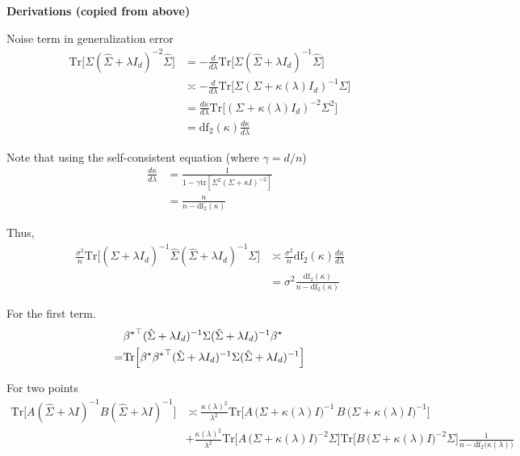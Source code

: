 \noindent\begin{minipage}[t]{1\columnwidth}%
\textbf{Derivations (copied from above)}

Noise term in generalization error
\begin{align*}
\mathrm{Tr}\Big[\Sigma(\hat{\Sigma}+\lambda I_{d})^{-2}\hat{\Sigma}\Big] & =-\frac{d}{d\lambda}\mathrm{Tr}\Big[\Sigma(\hat{\Sigma}+\lambda I_{d})^{-1}\hat{\Sigma}\Big]\\
 & \asymp-\frac{d}{d\lambda}\mathrm{Tr}\Big[\Sigma(\Sigma+\kappa(\lambda)I_{d})^{-1}\Sigma\Big]\\
 & =\frac{d\kappa}{d\lambda}\mathrm{Tr}\Big[(\Sigma+\kappa(\lambda)I_{d})^{-2}\Sigma^{2}\Big]\\
 & =\mathrm{df}_{2}(\kappa)\frac{d\kappa}{d\lambda}
\end{align*}

Note that using the self-consistent equation (where $\ensuremath{\gamma=d/n}$)
\begin{align*}
\frac{d\kappa}{d\lambda} & =\frac{1}{1-\gamma\mathrm{tr}[\Sigma^{2}(\Sigma+\kappa I)^{-2}]}\\
 & =\frac{n}{n-\mathrm{df}_{2}(\kappa)}
\end{align*}

Thus,
\begin{align*}
\frac{\sigma^{2}}{n}\mathrm{Tr}\Big[(\hat{\Sigma}+\lambda I_{d})^{-1}\hat{\Sigma}(\hat{\Sigma}+\lambda I_{d})^{-1}\Sigma\Big] & \asymp\frac{\sigma^{2}}{n}\mathrm{df}_{2}(\kappa)\frac{d\kappa}{d\lambda}\\
 & =\sigma^{2}\frac{\mathrm{df}_{2}(\kappa)}{n-\mathrm{df}_{2}(\kappa)}
\end{align*}

For the first term.
\begin{align*}
 & {{\beta^{\star}}}^{\top}(\hat{\Sigma}+\lambda I_{d})^{-1}\Sigma(\hat{\Sigma}+\lambda I_{d})^{-1}{\beta^{\star}}\\
= & \mathrm{Tr}\Big[{\beta^{\star}}{{\beta^{\star}}}^{\top}(\hat{\Sigma}+\lambda I_{d})^{-1}\Sigma(\hat{\Sigma}+\lambda I_{d})^{-1}\Big]
\end{align*}

For two points
\begin{align*}
\mbox{Tr}\bigl[A(\widehat{\Sigma}+\lambda I)^{-1}B(\widehat{\Sigma}+\lambda I)^{-1}\bigr] & \asymp\frac{\kappa(\lambda)^{2}}{\lambda^{2}\,}\mbox{Tr}\bigl[A\,\bigl(\Sigma+\kappa(\lambda)I\bigr)^{-1}\,B\,\bigl(\Sigma+\kappa(\lambda)I\bigr)^{-1}\bigr]\\
 & +\frac{\kappa(\lambda)^{2}}{\lambda^{2}}\mbox{Tr}\bigl[A\,\bigl(\Sigma+\kappa(\lambda)I\bigr)^{-2}\Sigma\bigr]\mbox{Tr}\bigl[B\,\bigl(\Sigma+\kappa(\lambda)I\bigr)^{-2}\Sigma\bigr]\frac{1}{n-\mathrm{df}_{2}\bigl(\kappa(\lambda)\bigr)}
\end{align*}


\end{minipage}
